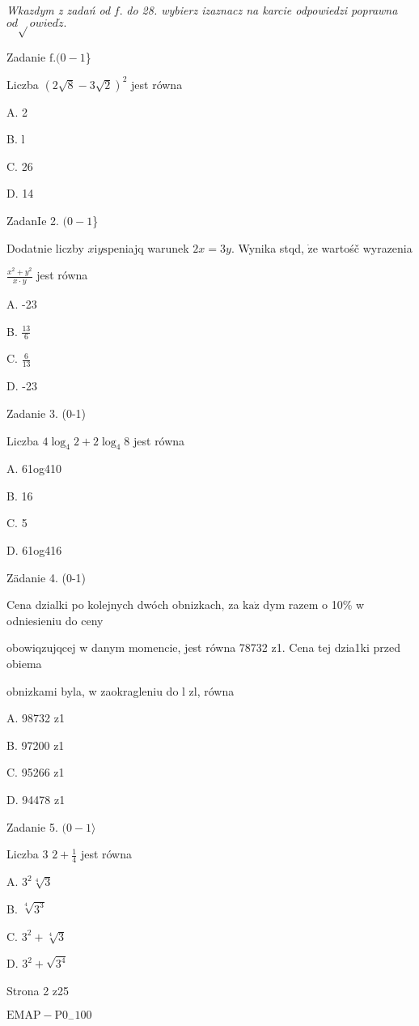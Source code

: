 \documentclass[a4paper,12pt]{article}
\begin{document}
{\it Wkazdym z zadań od} $f.$ {\it do 28. wybierz izaznacz na karcie odpowiedzi poprawna} $od\sqrt{}owi\mathrm{e}d\acute{z}.$

Zadanie $\mathrm{f}. (0-1$\}

Liczba $(2\sqrt{8}-3\sqrt{2})^{2}$ jest równa

A. 2

B. l

C. 26

D. 14

ZadanIe 2. $(0-1$\}

Dodatnie liczby $x \mathrm{i} y \mathrm{s}\mathrm{p}\mathrm{e}$niajq warunek $2x=3y$. Wynika stqd, $\dot{\mathrm{z}}\mathrm{e}$ wartośč wyrazenia

$\displaystyle \frac{x^{2}+y^{2}}{x\cdot y}$ jest równa

A. -23

B. $\displaystyle \frac{13}{6}$

C. $\displaystyle \frac{6}{13}$

D. -23

Zadanie 3. (0-1)

Liczba $4\log_{4}2+2\log_{4}8$ jest równa

A. 61og410

B. 16

C. 5

D. 61og416

Zädanie 4. (0-1)

Cena dzialki po kolejnych dwóch obnizkach, za $\mathrm{k}\mathrm{a}\dot{\mathrm{z}}$ dym razem o 10\% w odniesieniu do ceny

obowiqzujqcej w danym momencie, jest równa 78732 z1. Cena tej dzia1ki przed obiema

obnizkami byla, w zaokragleniu do l zl, równa

A. 98732 z1

B. 97200 z1

C. 95266 z1

D. 94478 z1

Zadanie 5. $(0-1\rangle$

Liczba 3 $2+\displaystyle \frac{1}{4}$ jest równa

A. $3^{2} \sqrt[4]{3}$

B. $\sqrt[4]{3^{3}}$

C. $3^{2}+\sqrt[4]{3}$

D. $3^{2}+ \sqrt{3^{4}}$

Strona 2 z25

$\mathrm{E}\mathrm{M}\mathrm{A}\mathrm{P}-\mathrm{P}0_{-}100$
\end{document}

